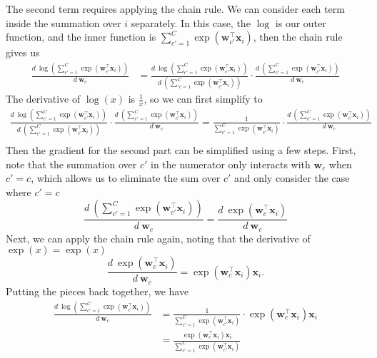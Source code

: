 \documentclass[10pt]{article}
\newcommand{\bx}{{\boldsymbol x}}
\newcommand{\bw}{{\boldsymbol w}}
\begin{document}
\begin{enumerate}
\begin{enumerate}
{The second term requires applying the chain rule. We can consider each term inside the summation over $i$ separately. In this case, the $\log$ is our outer function, and the inner function is $\sum_{c'=1}^C \exp(\bw_{c'}^\top \bx_i)$, then the chain rule gives us
\begin{equation}
\begin{aligned}
\frac{d ~ \log \left( \sum_{c' = 1}^C \exp(\bw_{c'}^\top \bx_i) \right) }{d ~ \bw_c} &= 
\frac{d ~ \log \left( \sum_{c' = 1}^C \exp(\bw_{c'}^\top \bx_i) \right) }{d ~ \left(\sum_{'c = 1}^C \exp(\bw_{c'}^\top \bx_i) \right)} \cdot \frac{d ~ \left(\sum_{c' = 1}^C \exp(\bw_{c'}^\top \bx_i) \right)}{d ~ \bw_c}
\end{aligned}
\end{equation}
The derivative of $\log(x)$ is $\tfrac{1}{x}$, so we can first simplify to
\begin{equation}
\begin{aligned}
\frac{d ~ \log \left( \sum_{c' = 1}^C \exp(\bw_{c'}^\top \bx_i) \right) }{d ~ \left(\sum_{c' = 1}^C \exp(\bw_{c'}^\top \bx_i) \right)} \cdot \frac{d ~ \left(\sum_{c' = 1}^C \exp(\bw_{c'}^\top \bx_i) \right)}{d ~ \bw_c}
= \frac{1}{\sum_{c' = 1}^C \exp(\bw_{c'}^\top \bx_i)} \cdot \frac{d ~ \left(\sum_{c' = 1}^C \exp(\bw_{c'}^\top \bx_i) \right)}{d ~ \bw_c}\\
\end{aligned}
\end{equation}
Then the gradient for the second part can be simplified using a few steps. First, note that the summation over $c'$ in the numerator only interacts with $\bw_c$ when $c' = c$, which allows us to eliminate the sum over $c'$ and only consider the case where $c'= c$
\[
\frac{d ~ \left(\sum_{c' = 1}^C \exp(\bw_{c'}^\top \bx_i) \right)}{d ~ \bw_c} = 
\frac{d ~ \exp(\bw_{c}^\top \bx_i)}{d ~ \bw_c}
\]
Next, we can apply the chain rule again, noting that the derivative of $\exp(x) = \exp(x)$
\[
\frac{d ~ \exp(\bw_{c}^\top \bx_i)}{d ~ \bw_c} = \exp(\bw_{c}^\top \bx_i) \bx_i.
\]
Putting the pieces back together, we have 
\begin{equation}
\begin{aligned}
\frac{d ~ \log \left( \sum_{c' = 1}^C \exp(\bw_{c'}^\top \bx_i) \right) }{d ~ \bw_c}
&= \frac{1}{\sum_{c' = 1}^C \exp(\bw_{c'}^\top \bx_i)} \cdot \exp(\bw_{c}^\top \bx_i) \bx_i\\
&= \frac{\exp(\bw_{c}^\top \bx_i) \bx_i}{\sum_{c' = 1}^C \exp(\bw_{c'}^\top \bx_i)} 
\end{aligned}
\end{equation}
}
\end{enumerate}
\end{enumerate}
\end{document}
